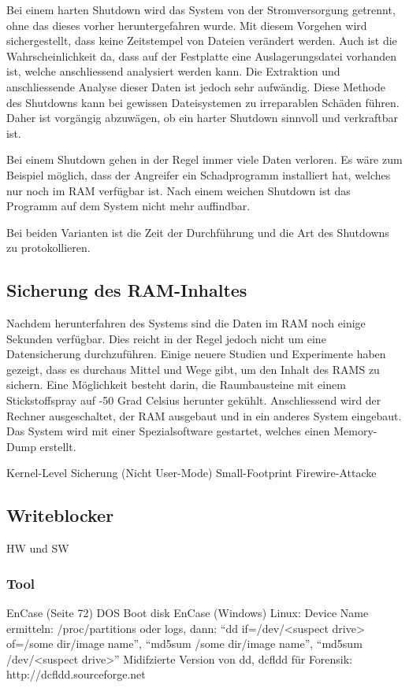 Bei einem harten Shutdown wird das System von der Stromversorgung getrennt, ohne das dieses vorher heruntergefahren wurde. Mit diesem Vorgehen wird sichergestellt, dass keine Zeitstempel von Dateien verändert werden. Auch ist die Wahrscheinlichkeit da, dass auf der Festplatte eine Auslagerungsdatei vorhanden ist, welche anschliessend analysiert werden kann. Die Extraktion und anschliessende Analyse dieser Daten ist jedoch sehr aufwändig. Diese Methode des Shutdowns kann bei gewissen Dateisystemen zu irreparablen Schäden führen. Daher ist vorgängig abzuwägen, ob ein harter Shutdown sinnvoll und verkraftbar ist.

Bei einem Shutdown gehen in der Regel immer viele Daten verloren. Es wäre zum Beispiel möglich, dass der Angreifer ein Schadprogramm installiert hat, welches nur noch im RAM verfügbar ist. Nach einem weichen Shutdown ist das Programm auf dem System nicht mehr auffindbar. 

Bei beiden Varianten ist die Zeit der Durchführung und die Art des Shutdowns zu protokollieren.

\subsection{Sicherung des RAM-Inhaltes}
Nachdem herunterfahren des Systems sind die Daten im RAM noch einige Sekunden verfügbar. Dies reicht in der Regel jedoch nicht um eine Datensicherung durchzuführen. Einige neuere Studien und Experimente haben gezeigt, dass es durchaus Mittel und Wege gibt, um den Inhalt des RAMS zu sichern. Eine Möglichkeit besteht darin, die Raumbausteine mit einem Stickstoffspray auf -50 Grad Celsius herunter gekühlt. Anschliessend wird der Rechner ausgeschaltet, der RAM ausgebaut und in ein anderes System eingebaut. Das System wird mit einer Spezialsoftware gestartet, welches einen Memory-Dump erstellt.

Kernel-Level Sicherung (Nicht User-Mode)
Small-Footprint
Firewire-Attacke
\subsection{Writeblocker}
HW und SW

\subsubsection{Tool}
EnCase (Seite 72) DOS Boot disk
EnCase (Windows)
Linux: Device Name ermitteln: /proc/partitions oder logs, dann: "`dd if=/dev/<suspect drive> of=/some dir/image name"', "`md5sum /some dir/image name"', "`md5sum /dev/<suspect drive>"'
Midifzierte Version von dd, dcfldd für Forensik: http://dcfldd.sourceforge.net

